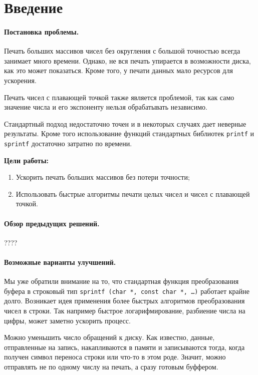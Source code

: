 \section*{Введение}
\paragraph{Постановка проблемы.}
Печать больших массивов чисел без округления с большой точностью всегда занимает много времени.
Однако, не вся печать упирается в возможности диска, как это может показаться.
Кроме того, у печати данных мало ресурсов для ускорения.

Печать чисел с плавающей точкой также является проблемой, так как само значение числа и его экспоненту нельзя обрабатывать независимо. 

Стандартный подход недостаточно точен и в некоторых случаях дает неверные результаты. 
Кроме того использование функций стандартных библиотек \texttt{printf} и  \texttt{sprintf} достаточно затратно по времени.

\textbf{Цели работы:}
\begin{enumerate}
\item Ускорить печать больших массивов без потери точности;
\item Использовать быстрые алгоритмы печати целых чисел и чисел с плавающей точкой.
\end{enumerate}

\paragraph{Обзор предыдущих решений.} ????
\paragraph{Возможные варианты улучшений.}
Мы уже обратили внимание на то, что стандартная функция преобразования буфера в строковый тип \texttt{sprintf (char *, const char *, \dots)} работает крайне долго. 
Возникает идея применения более быстрых алгоритмов преобразования чисел в строки. 
Так например быстрое логарифмирование, разбиение числа на цифры, может заметно ускорить процесс.

Можно уменьшить число обращений к диску.
Как известно, данные, отправленные на запись, накапливаются в памяти и записываются тогда, когда получен символ переноса строки или что-то в этом роде.
Значит, можно отправлять не по одному числу на печать, а сразу готовым буффером.

